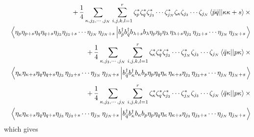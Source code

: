 \documentclass{article}
\begin{document}
\begin{eqnarray}
&&+\,\frac{1}{4}\sum_{\kappa ,j_{3},\cdots
,j_{N}\,}\sum_{i,j,k,l=1}^{r}\zeta _{p}^{\ast }\zeta _{q}^{\ast }\zeta
_{j_{3}}^{\ast }\cdots \zeta _{j_{N}}^{\ast }\zeta _{\kappa }\zeta
_{j_{3}}\cdots \zeta _{j_{N}}\left\langle \bar{p}\bar{q}||\kappa \kappa
+s\right\rangle \times  \notag \\
&&\left\langle \eta _{p}\eta _{p+s}\eta _{q}\eta _{q+s}\eta _{j_{3}}\eta
_{j_{3}+s}\cdots \eta _{j_{N}\,}\eta _{j_{N}+s}\left| b_{\bar{p}}^{\dagger
}b_{\bar{q}}^{\dagger }b_{\lambda +s}b_{\lambda }\eta _{p}\eta _{q}\eta
_{\lambda \,}\eta _{\lambda +s}\eta _{j_{3}\,}\eta _{j_{3}+s}\cdots \eta
_{j_{N}\,}\eta _{j_{N}+s}\right. \right\rangle
\end{eqnarray}%
\begin{eqnarray}
&&+\,\frac{1}{4}\sum_{\kappa ,j_{3},\cdots
,j_{N}\,}\sum_{i,j,k,l=1}^{r}\zeta _{\kappa }^{\ast }\zeta _{q}^{\ast }\zeta
_{j_{3}}^{\ast }\cdots \zeta _{j_{N}}^{\ast }\zeta _{j_{3}}\cdots \zeta
_{j_{N}}\left\langle \bar{q}\kappa ||p\kappa \right\rangle \times  \notag \\
&&\left\langle \eta _{\kappa }\eta _{\kappa +s}\eta _{q}\eta _{q+s}\eta
_{j_{3}\,}\eta _{j_{3}+s}\cdots \eta _{j_{N}\,}\eta _{j_{N}+s}\left| b_{\bar{%
q}}^{\dagger }b_{\kappa }^{\dagger }b_{\kappa }b_{p}\eta _{p}\eta _{q}\eta
_{\kappa \,}\eta _{\kappa +s}\eta _{j_{3}\,}\eta _{j_{3}+s}\cdots \eta
_{j_{N}\,}\eta _{j_{N}+s}\right. \right\rangle
\end{eqnarray}%
\begin{eqnarray}
&&+\,\frac{1}{4}\sum_{\kappa ,j_{3},\cdots
,j_{N}\,}\sum_{i,j,k,l=1}^{r}\zeta _{\kappa }^{\ast }\zeta _{q}^{\ast }\zeta
_{j_{3}}^{\ast }\cdots \zeta _{j_{N}}^{\ast }\zeta _{j_{3}}\cdots \zeta
_{j_{N}}\left\langle \bar{q}\kappa ||p\kappa \right\rangle \times  \notag \\
&&\left\langle \eta _{\kappa }\eta _{\kappa +s}\eta _{q}\eta _{q+s}\eta
_{j_{3}\,}\eta _{j_{3}+s}\cdots \eta _{j_{N}\,}\eta _{j_{N}+s}\left| b_{\bar{%
q}}^{\dagger }b_{\kappa }^{\dagger }b_{\kappa }b_{p}\eta _{p}\eta _{q}\eta
_{\kappa \,}\eta _{\kappa +s}\eta _{j_{3}\,}\eta _{j_{3}+s}\cdots \eta
_{j_{N}\,}\eta _{j_{N}+s}\right. \right\rangle
\end{eqnarray}%
which gives 
\end{document}
